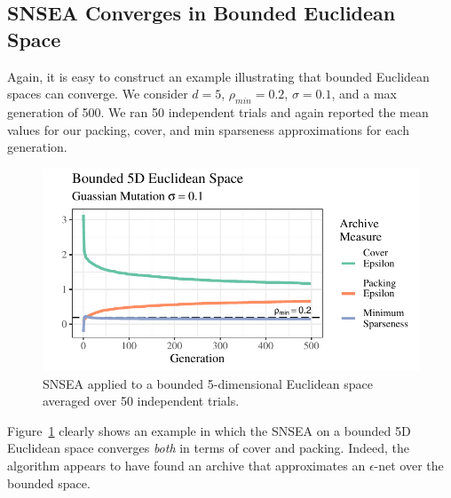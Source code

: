 \documentclass[twoside]{article}
\begin{document}
\subsection{SNSEA Converges in Bounded Euclidean Space}
\label{subsec:bounded}
Again, it is easy to construct an example illustrating that bounded Euclidean spaces can converge.  We consider $d=5$, $\rho_{min} = 0.2$, $\sigma=0.1$, and a max generation of 500.  We ran 50 independent trials and again reported the mean values for our packing, cover, and min sparseness approximations for each generation.  
\begin{figure}[t]
  \center\includegraphics[width=1\textwidth]{Figures/bounded-s01-r02-NOPOP.pdf}
  \caption{\label{fig:bounded:nopop:0103} SNSEA applied to a bounded 5-dimensional Euclidean space averaged over 50 independent trials.}
\end{figure}
%
Figure~\ref{fig:bounded:nopop:0103} clearly shows an example in which the SNSEA on a bounded 5D Euclidean space converges \emph{both} in terms of cover and packing.  Indeed, the algorithm appears to have found an archive that approximates an $\epsilon$-net over the bounded space.  
\end{document}
